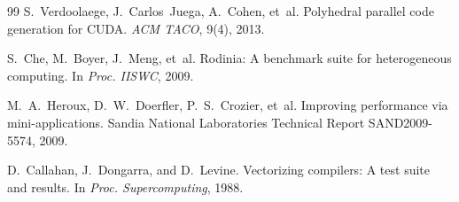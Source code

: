 \documentclass[sigconf]{acmart}
\begin{document}
\begin{thebibliography}{99}
S.~Verdoolaege, J.~Carlos~Juega, A.~Cohen, et~al.
\newblock Polyhedral parallel code generation for {CUDA}.
\newblock \emph{ACM TACO}, 9(4), 2013.

S.~Che, M.~Boyer, J.~Meng, et~al.
\newblock Rodinia: A benchmark suite for heterogeneous computing.
\newblock In \emph{Proc. IISWC}, 2009.

M.~A.~Heroux, D.~W.~Doerfler, P.~S.~Crozier, et~al.
\newblock Improving performance via mini-applications.
\newblock Sandia National Laboratories Technical Report SAND2009-5574, 2009.

D.~Callahan, J.~Dongarra, and D.~Levine.
\newblock Vectorizing compilers: A test suite and results.
\newblock In \emph{Proc. Supercomputing}, 1988.

\end{thebibliography}
\end{document}

